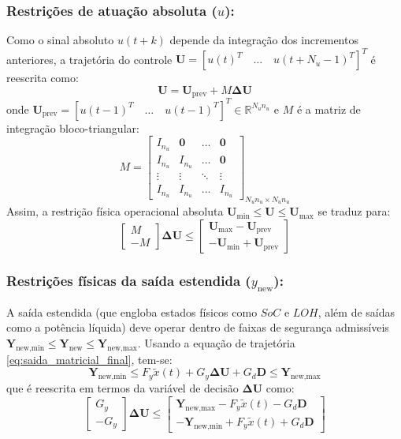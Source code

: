 \documentclass[12pt]{article}
\begin{document}
\subsubsection{Restrições de atuação absoluta ($u$):}
Como o sinal absoluto $u(t+k)$ depende da integração dos incrementos anteriores, a trajetória do controle $\bm{U} = [u(t)^T \quad \dots \quad u(t+N_u-1)^T]^T$ é reescrita como:
\begin{equation}
\bm{U} = \bm{U}_{\text{prev}} + M \bm{\Delta U}
\end{equation}
onde $\bm{U}_{\text{prev}} = [u(t-1)^T \quad \dots \quad u(t-1)^T]^T \in \mathbb{R}^{N_u n_u}$ e $M$ é a matriz de integração bloco-triangular:
\begin{equation}
M = \begin{bmatrix} 
I_{n_u} & \bm{0} & \dots & \bm{0} \\
I_{n_u} & I_{n_u} & \dots & \bm{0} \\
\vdots & \vdots & \ddots & \vdots \\
I_{n_u} & I_{n_u} & \dots & I_{n_u}
\end{bmatrix}_{N_u n_u \times N_u n_u}
\end{equation}
Assim, a restrição física operacional absoluta $\bm{U}_{\text{min}} \le \bm{U} \le \bm{U}_{\text{max}}$ se traduz para:
\begin{equation}
\begin{bmatrix} M \\ -M \end{bmatrix} \bm{\Delta U} \le \begin{bmatrix} \bm{U}_{\text{max}} - \bm{U}_{\text{prev}} \\ -\bm{U}_{\text{min}} + \bm{U}_{\text{prev}} \end{bmatrix}
\end{equation}

\subsubsection{Restrições físicas da saída estendida ($y_{\text{new}}$):}
A saída estendida (que engloba estados físicos como $SoC$ e $LOH$, além de saídas como a potência líquida) deve operar dentro de faixas de segurança admissíveis $\bm{Y}_{\text{new,min}} \le \bm{Y}_{\text{new}} \le \bm{Y}_{\text{new,max}}$. Usando a equação de trajetória \eqref{eq:saida_matricial_final}, tem-se:
\begin{equation}
\bm{Y}_{\text{new,min}} \le F_y \tilde{x}(t) + G_y \bm{\Delta U} + G_d \bm{D} \le \bm{Y}_{\text{new,max}}
\end{equation}
que é reescrita em termos da variável de decisão $\bm{\Delta U}$ como:
\begin{equation}
\begin{bmatrix} G_y \\ -G_y \end{bmatrix} \bm{\Delta U} \le \begin{bmatrix} \bm{Y}_{\text{new,max}} - F_y \tilde{x}(t) - G_d \bm{D} \\ -\bm{Y}_{\text{new,min}} + F_y \tilde{x}(t) + G_d \bm{D} \end{bmatrix}
\end{equation}
\end{document}
